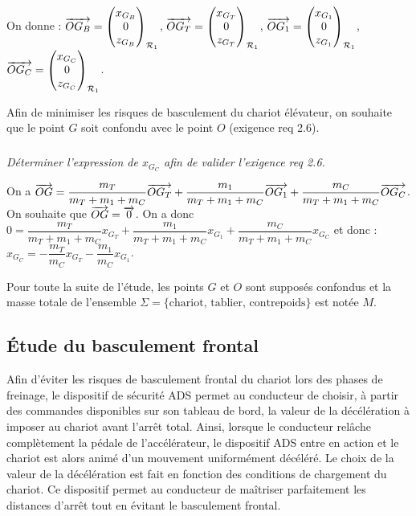 \documentclass[10pt,fleqn]{article} %
\begin{document}
\begin{multicols}{2}
On donne : 
$\overrightarrow{OG_B}=\begin{pmatrix}x_{G_B} \\ 0 \\ z_{G_B}\end{pmatrix}_{\mathcal{R}_{1}}$,
$\overrightarrow{OG_T}=\begin{pmatrix}x_{G_T} \\ 0 \\ z_{G_T}\end{pmatrix}_{\mathcal{R}_{1}}$,
$\overrightarrow{OG_1}=\begin{pmatrix}x_{G_1} \\ 0 \\ z_{G_1}\end{pmatrix}_{\mathcal{R}_{1}}$,
$\overrightarrow{OG_C}=\begin{pmatrix}x_{G_C} \\ 0 \\ z_{G_C}\end{pmatrix}_{\mathcal{R}_{1}}$.

Afin de minimiser les risques de basculement du chariot élévateur, on souhaite que le point $G$ soit
confondu avec le point $O$ (exigence req 2.6).


\subparagraph{}
\textit{Déterminer l’expression de $x_{G_C}$ afin de valider l'exigence req 2.6.}
\ifprof
\begin{corrige}
On a $\overrightarrow{OG}=\dfrac{m_T}{m_T+m_1+m_C}\overrightarrow{OG_T}+\dfrac{m_1}{m_T+m_1+m_C}\overrightarrow{OG_1}+\dfrac{m_C}{m_T+m_1+m_C}\overrightarrow{OG_C}$. On souhaite que $\overrightarrow{OG}=\overrightarrow{0}$. 
On a donc $0=\dfrac{m_T}{m_T+m_1+m_C}x_{G_T}+\dfrac{m_1}{m_T+m_1+m_C}x_{G_1}+\dfrac{m_C}{m_T+m_1+m_C}x_{G_C}$ et donc : $x_{G_C}=-\dfrac{m_T}{m_C}x_{G_T}-\dfrac{m_1}{m_C}x_{G_1}$.
\end{corrige}
\else
\fi


Pour toute la suite de l’étude, les points $G$ et $O$ sont supposés confondus et la masse totale de
l’ensemble $\Sigma =  \{\text{chariot, tablier, contrepoids}\}$ est notée $M$.

\subsection*{Étude du basculement frontal}
Afin d’éviter les risques de basculement frontal du chariot lors des phases de freinage, le dispositif de
sécurité ADS permet au conducteur de choisir, à partir des commandes disponibles sur son tableau de
bord, la valeur de la décélération à imposer au chariot avant l’arrêt total. Ainsi, lorsque le conducteur
relâche complètement la pédale de l’accélérateur, le dispositif ADS entre en action et le chariot est
alors animé d’un mouvement uniformément décéléré. Le choix de la valeur de la décélération est fait
en fonction des conditions de chargement du chariot. Ce dispositif permet au conducteur de maîtriser
parfaitement les distances d’arrêt tout en évitant le basculement frontal.


\end{multicols}
\end{document}
